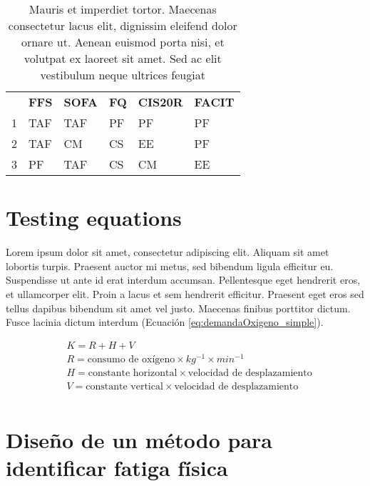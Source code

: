 \begin{table}
\footnotesize
\centering
\caption{Mauris et imperdiet tortor. Maecenas consectetur lacus elit, dignissim eleifend dolor ornare ut. Aenean euismod porta nisi, et volutpat ex laoreet sit amet. Sed ac elit vestibulum neque ultrices feugiat}
\label{tab:recopilacionDeCuestionarios}
\begin{tabular}{m{0.2cm}m{2.5cm}m{2.5cm}m{2.5cm}m{2.5cm}m{2.5cm}}
\hline\noalign{\smallskip}
 & \textbf{FFS} & \textbf{SOFA} & \textbf{FQ} & \textbf{CIS20R} & \textbf{FACIT}
\\ \noalign{\smallskip}
\hline
\noalign{\smallskip}
1	&	TAF	&	TAF	&	PF	&	PF	&	PF\\
2	&	TAF	&	CM	&	CS	&	EE	&	PF\\
3	&	PF	&	TAF	&	CS	&	CM	&	EE\\
\hline
\end{tabular}
\end{table}



\section{Testing equations}\label{secc:pruebasFisicas}
Lorem ipsum dolor sit amet, consectetur adipiscing elit. Aliquam sit amet lobortis turpis. Praesent auctor mi metus, sed bibendum ligula efficitur eu. Suspendisse ut ante id erat interdum accumsan. Pellentesque eget hendrerit eros, et ullamcorper elit. Proin a lacus et sem hendrerit efficitur. Praesent eget eros sed tellus dapibus bibendum sit amet vel justo. Maecenas finibus porttitor dictum. Fusce lacinia dictum interdum (Ecuación \ref{eq:demandaOxigeno_simple}).


\begin{equation} \label{eq:demandaOxigeno_simple}
\begin{split} 
& K = R + H + V \\ 
& R = \textrm{consumo de oxígeno} \times kg^{-1} \times min^{-1}\\ 
& H = \textrm{constante horizontal} \times \textrm{velocidad de desplazamiento}\\ 
& V = \textrm{constante vertical} \times \textrm{velocidad de desplazamiento}\\ 
\end{split} 
\end{equation} 


\section{Diseño de un método para identificar fatiga física}\label{secc:disenoMetodoFatiga}

